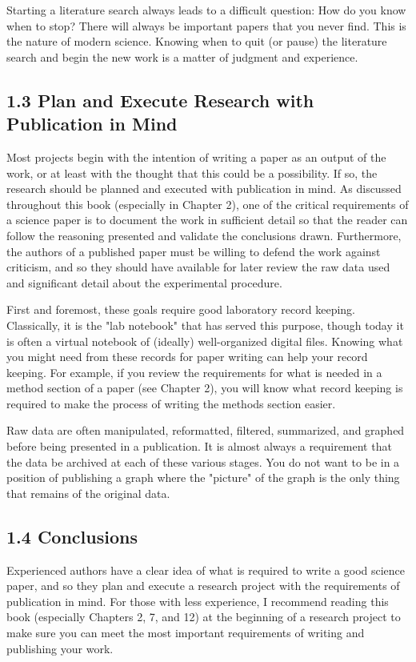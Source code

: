 Starting a literature search always leads to a difficult question: How do you know when to stop? There will always be important papers that you never find. This is the nature of modern science. Knowing when to quit (or pause) the literature search and begin the new work is a matter of judgment and experience.

\subsection*{1.3 Plan and Execute Research with Publication in Mind}
Most projects begin with the intention of writing a paper as an output of the work, or at least with the thought that this could be a possibility. If so, the research should be planned and executed with publication in mind. As discussed throughout this book (especially in Chapter 2), one of the critical requirements of a science paper is to document the work in sufficient detail so that the reader can follow the reasoning presented and validate the conclusions drawn. Furthermore, the authors of a published paper must be willing to defend the work against criticism, and so they should have available for later review the raw data used and significant detail about the experimental procedure.

First and foremost, these goals require good laboratory record keeping. Classically, it is the "lab notebook" that has served this purpose, though today it is often a virtual notebook of (ideally) well-organized digital files. Knowing what you might need from these records for paper writing can help your record keeping. For example, if you review the requirements for what is needed in a method section of a paper (see Chapter 2), you will know what record keeping is required to make the process of writing the methods section easier.

Raw data are often manipulated, reformatted, filtered, summarized, and graphed before being presented in a publication. It is almost always a requirement that the data be archived at each of these various stages. You do not want to be in a position of publishing a graph where the "picture" of the graph is the only thing that remains of the original data.

\subsection*{1.4 Conclusions}
Experienced authors have a clear idea of what is required to write a good science paper, and so they plan and execute a research project with the requirements of publication in mind. For those with less experience, I recommend reading this book (especially Chapters 2, 7, and 12) at the beginning of a research project to make sure you can meet the most important requirements of writing and publishing your work.

